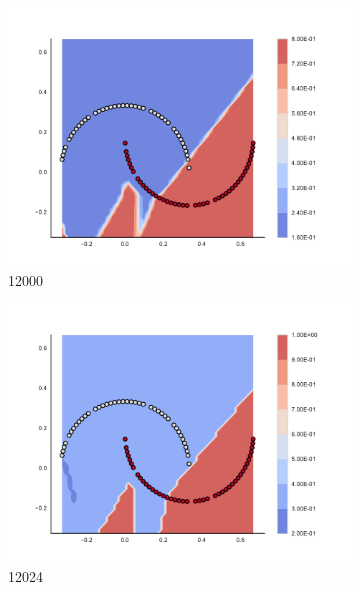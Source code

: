 \begin{figure}[h]
\begin{subfigure}[b]{0.09\textwidth}
    \includegraphics[clip, trim=2.35cm 1.75cm 4.5cm 0cm,width=\textwidth]{img/convergence/12000.pdf}
    \caption{12000}
    \label{fig:convergence_12000}
\end{subfigure}
%
\begin{subfigure}[b]{0.09\textwidth}
    \includegraphics[clip, trim=2.35cm 1.75cm 4.5cm 0cm,width=\textwidth]{img/convergence/12024.pdf}
    \caption{12024}
    \label{fig:convergence_12024}
\end{subfigure}
%
\begin{subfigure}[b]{0.09\textwidth}

\end{subfigure}
\end{figure}
